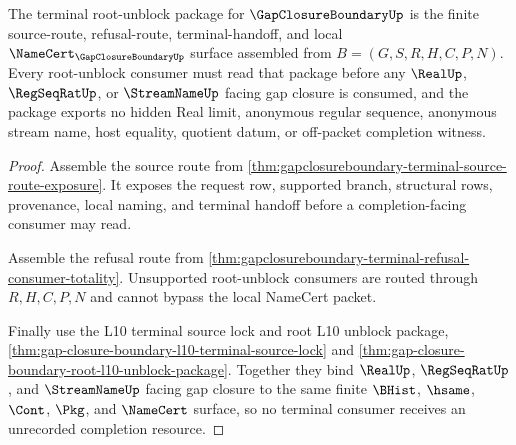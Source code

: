 \begin{theorem}
\label{thm:gapclosureboundary-terminal-namecert-unblock-package}
The terminal root-unblock package for $\GapClosureBoundaryUp$ is the finite source-route, refusal-route, terminal-handoff, and local $\NameCert_{\GapClosureBoundaryUp}$ surface assembled from $B=(G,S,R,H,C,P,N)$. Every root-unblock consumer must read that package before any $\RealUp$, $\RegSeqRatUp$, or $\StreamNameUp$ facing gap closure is consumed, and the package exports no hidden Real limit, anonymous regular sequence, anonymous stream name, host equality, quotient datum, or off-packet completion witness.
\end{theorem}
\begin{proof}
Assemble the source route from \autoref{thm:gapclosureboundary-terminal-source-route-exposure}. It exposes the request row, supported branch, structural rows, provenance, local naming, and terminal handoff before a completion-facing consumer may read.

Assemble the refusal route from \autoref{thm:gapclosureboundary-terminal-refusal-consumer-totality}. Unsupported root-unblock consumers are routed through $R,H,C,P,N$ and cannot bypass the local NameCert packet.

Finally use the L10 terminal source lock and root L10 unblock package, \autoref{thm:gap-closure-boundary-l10-terminal-source-lock} and \autoref{thm:gap-closure-boundary-root-l10-unblock-package}. Together they bind $\RealUp$, $\RegSeqRatUp$, and $\StreamNameUp$ facing gap closure to the same finite $\BHist$, $\hsame$, $\Cont$, $\Pkg$, and $\NameCert$ surface, so no terminal consumer receives an unrecorded completion resource.
\end{proof}
